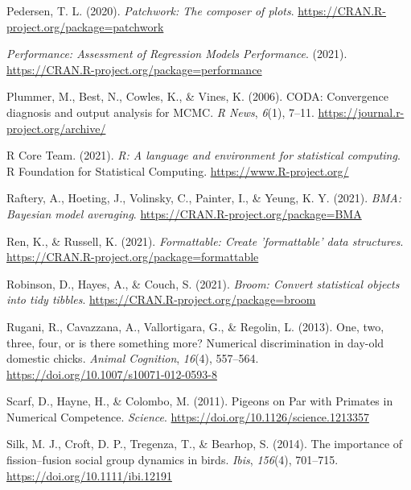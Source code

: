 \documentclass[
  ,doc,floatsintext]{apa6}
\newlength{\cslhangindent}
\newlength{\cslentryspacingunit} %
\newenvironment{CSLReferences}[2] %
 {%
  \setlength{\parindent}{0pt}
  \ifodd #1
  \let\oldpar\par
  \def\par{\hangindent=\cslhangindent\oldpar}
  \fi
  \setlength{\parskip}{#2\cslentryspacingunit}
 }%
 {}
\begin{document}
\begin{CSLReferences}{1}{0}
\leavevmode{}%
Pedersen, T. L. (2020). \emph{Patchwork: The composer of plots}. \url{https://CRAN.R-project.org/package=patchwork}

\leavevmode{}%
\emph{Performance: {Assessment} of {Regression} {Models} {Performance}}. (2021). \url{https://CRAN.R-project.org/package=performance}

\leavevmode{}%
Plummer, M., Best, N., Cowles, K., \& Vines, K. (2006). CODA: Convergence diagnosis and output analysis for MCMC. \emph{R News}, \emph{6}(1), 7--11. \url{https://journal.r-project.org/archive/}

\leavevmode{}%
R Core Team. (2021). \emph{R: A language and environment for statistical computing}. R Foundation for Statistical Computing. \url{https://www.R-project.org/}

\leavevmode{}%
Raftery, A., Hoeting, J., Volinsky, C., Painter, I., \& Yeung, K. Y. (2021). \emph{BMA: Bayesian model averaging}. \url{https://CRAN.R-project.org/package=BMA}

\leavevmode{}%
Ren, K., \& Russell, K. (2021). \emph{Formattable: Create 'formattable' data structures}. \url{https://CRAN.R-project.org/package=formattable}

\leavevmode{}%
Robinson, D., Hayes, A., \& Couch, S. (2021). \emph{Broom: Convert statistical objects into tidy tibbles}. \url{https://CRAN.R-project.org/package=broom}

\leavevmode{}%
Rugani, R., Cavazzana, A., Vallortigara, G., \& Regolin, L. (2013). One, two, three, four, or is there something more? {Numerical} discrimination in day-old domestic chicks. \emph{Animal Cognition}, \emph{16}(4), 557--564. \url{https://doi.org/10.1007/s10071-012-0593-8}

\leavevmode{}%
Scarf, D., Hayne, H., \& Colombo, M. (2011). Pigeons on {Par} with {Primates} in {Numerical} {Competence}. \emph{Science}. \url{https://doi.org/10.1126/science.1213357}

\leavevmode{}%
Silk, M. J., Croft, D. P., Tregenza, T., \& Bearhop, S. (2014). The importance of fission--fusion social group dynamics in birds. \emph{Ibis}, \emph{156}(4), 701--715. \url{https://doi.org/10.1111/ibi.12191}


\end{CSLReferences}
\end{document}
